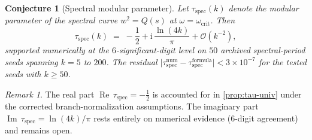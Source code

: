 \documentclass[11pt,a4paper]{article}
\theoremstyle{plain}
\newtheorem{conjecture}[theorem]{Conjecture}
\theoremstyle{definition}
\theoremstyle{remark}
\newtheorem{remark}[theorem]{Remark}
\DeclareMathOperator{\Real}{Re}
\DeclareMathOperator{\Imag}{Im}
\newcommand{\ii}{\mathrm{i}}
\newcommand{\Oo}{\mathcal{O}}
\begin{document}
\begin{conjecture}[Spectral modular parameter]
\label{conj:tau-spec}
Let $\tau_{\mathrm{spec}}(k)$ denote the modular parameter of the
spectral curve $w^2 = Q(s)$ at $\omega = \omega_{\mathrm{crit}}$.
Then
\begin{equation}\label{eq:tau-spec}
  \tau_{\mathrm{spec}}(k)
  \;=\; -\frac{1}{2} + \ii\,\frac{\ln(4k)}{\pi} + \Oo(k^{-2}),
\end{equation}
supported numerically at the $6$-significant-digit level on $50$ archived
spectral-period seeds spanning $k=5$ to $200$.  The residual
$\lvert\tau_{\mathrm{spec}}^{\mathrm{num}} - \tau_{\mathrm{spec}}^%
  {\mathrm{formula}}\rvert < 3 \times 10^{-7}$
for the tested seeds with $k \ge 50$.
\end{conjecture}

\begin{remark}
The real part $\Real\,\tau_{\mathrm{spec}} = -\tfrac12$ is
accounted for in \cref{prop:tau-univ} under the corrected
branch-normalization assumptions.  The imaginary part
$\Imag\,\tau_{\mathrm{spec}} = \ln(4k)/\pi$ rests entirely on
numerical evidence ($6$-digit agreement) and remains open.
\end{remark}
\end{document}
